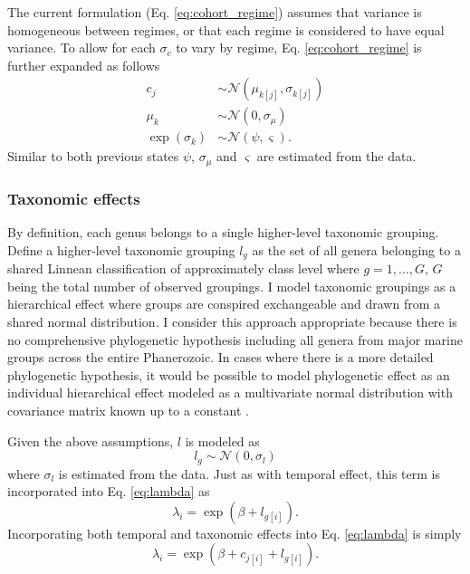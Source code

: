 \documentclass[12pt,letterpaper]{article}
\begin{document}
The current formulation (Eq. \ref{eq:cohort_regime}) assumes that variance is homogeneous between regimes, or that each regime is considered to have equal variance. To allow for each \(\sigma_{c}\) to vary by regime, Eq. \ref{eq:cohort_regime} is further expanded as follows
\begin{equation}
  \begin{aligned}
    c_{j} &\sim \mathcal{N}(\mu_{k[j]}, \sigma_{k[j]}) \\
    \mu_{k} &\sim \mathcal{N}(0, \sigma_{\mu}) \\
    \exp(\sigma_{k}) &\sim \mathcal{N}(\psi, \varsigma).
  \end{aligned}
  \label{eq:temporal_complex}
\end{equation}
Similar to both previous states \(\psi\), \(\sigma_{\mu}\) and \(\varsigma\) are estimated from the data.


\subsubsection{Taxonomic effects}

By definition, each genus belongs to a single higher-level taxonomic grouping. Define a higher-level taxonomic grouping \(l_{g}\) as the set of all genera belonging to a shared Linnean classification of approximately class level where \(g = 1, \dots, G\), \(G\) being the total number of observed groupings. I model taxonomic groupings as a hierarchical effect where groups are conspired exchangeable and drawn from a shared normal distribution. I consider this approach appropriate because there is no comprehensive phylogenetic hypothesis including all genera from major marine groups across the entire Phanerozoic. In cases where there is a more detailed phylogenetic hypothesis, it would be possible to model phylogenetic effect as an individual hierarchical effect modeled as a multivariate normal distribution with covariance matrix known up to a constant \citep{Lynch1991,Housworth2004}.

Given the above assumptions, \(l\) is modeled as
\begin{equation}
  l_{g} \sim \mathcal{N}(0, \sigma_{l})
  \label{eq:taxon}
\end{equation}
where \(\sigma_{l}\) is estimated from the data. Just as with temporal effect, this term is incorporated into Eq. \ref{eq:lambda} as
\begin{equation}
  \lambda_{i} = \exp(\beta + l_{g[i]}).
  \label{eq:lambda_taxon}
\end{equation}
Incorporating both temporal and taxonomic effects into Eq. \ref{eq:lambda} is simply
\begin{equation}
  \lambda_{i} = \exp(\beta + c_{j[i]} + l_{g[i]}).
  \label{eq:lambda_full}
\end{equation}
\end{document}
